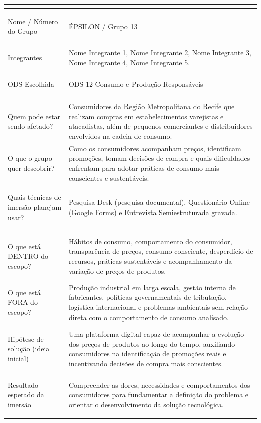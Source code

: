 \documentclass[12pt, a4paper]{article}
\begin{document}
\renewcommand{\arraystretch}{1.45}
\begingroup
\small
\begin{xltabular}{\textwidth}{!{\color{wineSoft}\vrule}>{\bfseries\color{wineDeep}\raggedright\arraybackslash}p{4.1cm}!{\color{wineSoft}\vrule}X!{\color{wineSoft}\vrule}}
\hline
{}\\ \hline
Nome / Número do Grupo & ÉPSILON / Grupo 13 \\ \hline
Integrantes & Nome Integrante 1, Nome Integrante 2, Nome Integrante 3, Nome Integrante 4, Nome Integrante 5. \\ \hline
ODS Escolhida & ODS 12 \textemdash{} Consumo e Produção Responsáveis \\ \hline
{}\\ \hline
Quem pode estar sendo afetado? & Consumidores da Região Metropolitana do Recife que realizam compras em estabelecimentos varejistas e atacadistas, além de pequenos comerciantes e distribuidores envolvidos na cadeia de consumo. \\ \hline
O que o grupo quer descobrir? & Como os consumidores acompanham preços, identificam promoções, tomam decisões de compra e quais dificuldades enfrentam para adotar práticas de consumo mais conscientes e sustentáveis. \\ \hline
Quais técnicas de imersão planejam usar? & Pesquisa Desk (pesquisa documental), Questionário Online (Google Forms) e Entrevista Semiestruturada gravada. \\ \hline
{}\\ \hline
O que está DENTRO do escopo? & Hábitos de consumo, comportamento do consumidor, transparência de preços, consumo consciente, desperdício de recursos, práticas sustentáveis e acompanhamento da variação de preços de produtos. \\ \hline
O que está FORA do escopo? & Produção industrial em larga escala, gestão interna de fabricantes, políticas governamentais de tributação, logística internacional e problemas ambientais sem relação direta com o comportamento de consumo analisado. \\ \hline
Hipótese de solução (ideia inicial) & Uma plataforma digital capaz de acompanhar a evolução dos preços de produtos ao longo do tempo, auxiliando consumidores na identificação de promoções reais e incentivando decisões de compra mais conscientes. \\ \hline
Resultado esperado da imersão & Compreender as dores, necessidades e comportamentos dos consumidores para fundamentar a definição do problema e orientar o desenvolvimento da solução tecnológica. \\ \hline
\end{xltabular}
\endgroup
\end{document}
